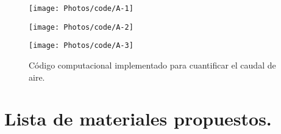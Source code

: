 \documentclass[11pt,letter
								]
								{article}
\begin{document}
\begin{figure}[H]
\centering
\texttt{[image: Photos/code/A-1]}
\end{figure}

\begin{figure}[H]
\centering
\texttt{[image: Photos/code/A-2]}
\end{figure}


\begin{figure}[H]
\centering
\texttt{[image: Photos/code/A-3]}
\caption{Código computacional implementado para cuantificar el caudal de aire. }
\end{figure}


\section{Lista de materiales propuestos.}
\end{document}

